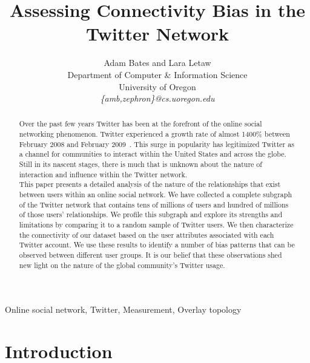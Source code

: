 \documentclass[10pt,twocolumn]{IEEEtran11}
\begin{document}


\title{\Large \bf Assessing Connectivity Bias in the Twitter Network
}

\author{Adam Bates and Lara Letaw\\
Department of Computer \& Information Science\\
University of Oregon\\
\textit{\{amb,zephron\}@cs.uoregon.edu}}

\maketitle
\pagestyle{empty}
\begin{abstract}
Over the past few years Twitter has been at the forefront of the online social networking phenomenon.  Twitter experienced a growth rate of almost 1400\% between February 2008 and February 2009~\cite{lrossi:mcgiboney_twitters_2009}.  This surge in popularity has legitimized Twitter as a channel for communities to interact within the United States and across the globe.  Still in its nascent stages, there is much that is unknown about the nature of interaction and influence within the Twitter network.\\
This paper presents a detailed analysis of the nature of the relationships that exist between users within an online social network.  We have collected a complete subgraph of the Twitter network that contains tens of millions of users and hundred of millions of those users' relationships.  We profile this subgraph and explore its strengths and limitations by comparing it to a random sample of Twitter users.  We then characterize the connectivity of our dataset based on the user attributes associated with each Twitter account.  We use these results to identify a number of bias patterns that can be observed between different user groups.  It is our belief that these observations shed new light on the nature of the global community's Twitter usage.\\
\end{abstract}

\begin{keywords} 
Online social network, Twitter, Measurement, Overlay topology
\end{keywords}

\section{Introduction}
\label{sec:introduction}

\end{document}

